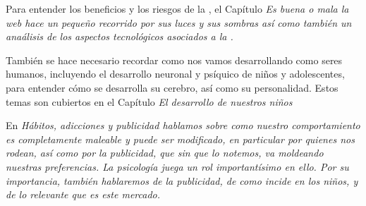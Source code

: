 
% 
% 
% 

Para entender los beneficios y los riesgos de la \web, el Cap\'itulo
\it{\oqm Es buena o mala la web\cqm}
hace un peque\~no recorrido por sus luces y sus sombras as\'i
como tambi\'en un ana\'alisis de los aspectos tecnol\'ogicos asociados a  
la \internet. 

Tambi\'en se hace necesario recordar como nos vamos desarrollando como
seres humanos, incluyendo el desarrollo neuronal y ps\'iquico 
de ni\~nos y adolescentes, para entender c\'omo se desarrolla su 
cerebro, as\'i como su personalidad. Estos temas son cubiertos en el
Cap\'itulo \it{El desarrollo de nuestros ni\~nos}

En \it{H\'abitos, adicciones y publicidad} hablamos sobre como nuestro comportamiento es
completamente maleable y puede ser modificado,
en particular por quienes nos rodean, as\'i como por la publicidad,
que sin que lo notemos, va moldeando nuestras preferencias.
La psicolog\'ia juega un rol important\'isimo en ello.
Por su importancia, tambi\'en hablaremos de la publicidad, 
de como incide en los ni\~nos, y de lo relevante que es este mercado.

